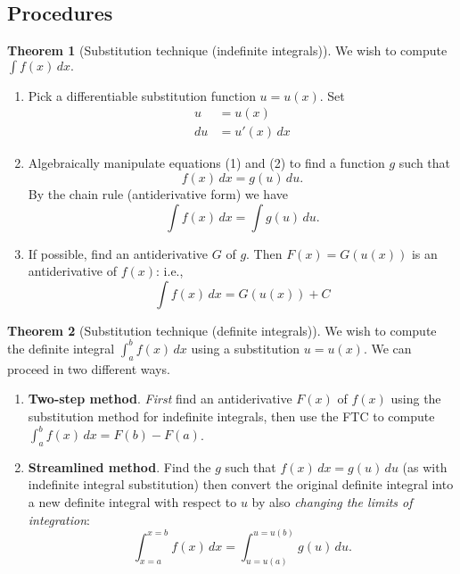 \documentclass[11pt]{article}
\theoremstyle{definition}
\newtheorem*{comment}{Comment}
\theoremstyle{named}
\newtheorem*{namedtheorem}{Theorem}
\numberwithin{myalgctr}{section}
\begin{document}
\subsection*{Procedures}
\begin{namedtheorem}[Substitution technique (indefinite integrals)] We wish to compute
$
\displaystyle\int f(x)\, dx.
$
\begin{enumerate}[itemsep=0pt, topsep=0pt]
  \item Pick a differentiable substitution function $u=u(x)$. Set
  \begin{align}
    u&=u(x)\\
    du&=u'(x)\, dx
  \end{align}
  \item Algebraically manipulate equations (1) and (2) to find a function $g$ such that
  \[
  f(x)\, dx=g(u)\, du.
  \]
  By the chain rule (antiderivative form) we have
  \[
  \int f(x)\, dx=\int g(u)\, du.
  \]
  \item If possible, find an antiderivative $G$ of $g$. Then $F(x)=G(u(x))$ is an antiderivative of $f(x)$: i.e.,
  \[
  \int f(x)\, dx=G(u(x))+C
  \]
\end{enumerate}

\end{namedtheorem}
\begin{comment}
There is no such thing as a {\em correct} or {\em incorrect} substitution, and you are encouraged to be creative with your choice of substitution $u(x)$. Instead think of a substitution as either {\em helpful} or {\em not helpful} (or possibly {\em somewhat helpful}). The success of a particular choice of $u(x)$ depends on two factors:
\begin{enumerate}[itemsep=0pt, topsep=0pt]
  \item Can you algebraically find a function $g$ such that $f(x)=g(u(x))u'(x)$?
  \item Having found a suitable $g$, can you find an antiderivative $G$ of $g$?
\end{enumerate}
\end{comment}
\newpage
\begin{namedtheorem}[Substitution technique (definite integrals)]
We wish to compute the definite integral $\displaystyle\int_a^b f(x)\, dx$ using a substitution $u=u(x)$. We can proceed in two different ways.
\begin{enumerate}[itemsep=0pt]
  \item {\bf Two-step method}. {\em First} find an antiderivative $F(x)$ of $f(x)$ using the substitution method for indefinite integrals, then use the FTC to compute $\displaystyle\int_a^bf(x)\, dx=F(b)-F(a)$.
  \item {\bf Streamlined method}. Find the $g$ such that $f(x)\, dx=g(u)\, du$ (as with indefinite integral substitution) then convert the original definite integral into a new definite integral with respect to $u$ by also {\em changing the limits of integration}:
  \[
  \int_{x=a}^{x=b}f(x)\, dx=\int_{u=u(a)}^{u=u(b)}g(u)\, du.
  \]
\end{enumerate}
\end{namedtheorem}
\end{document}
